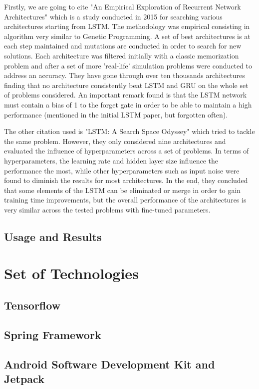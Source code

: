 Firstly, we are going to cite "An Empirical Exploration of Recurrent Network Architectures" \cite{jozefowicz2015empirical} which is a study conducted in 2015 for searching various architectures starting from LSTM. The methodology was empirical consisting in algorithm very similar to Genetic Programming. A set of best architectures is at each step maintained and mutations are conducted in order to search for new solutions. Each architecture was filtered initially with a classic memorization problem and after a set of more 'real-life' simulation problems were conducted to address an accuracy. They have gone through over ten thousands architectures finding that no architecture consistently beat LSTM and GRU on the whole set of problems considered. An important remark found is that the LSTM network must contain a bias of 1 to the forget gate in order to be able to maintain a high performance (mentioned in the initial LSTM paper, but forgotten often).

The other citation used is "LSTM: A Search Space Odyssey" \cite{greff2016lstm} which tried to tackle the same problem. However, they only considered nine architectures and evaluated the influence of hyperparameters across a set of problems. In terms of hyperparameters, the learning rate and hidden layer size influence the performance the most, while other hyperparameters such as input noise were found to diminish the results for most architectures. In the end, they concluded that some elements of the LSTM can be eliminated or merge in order to gain training time improvements, but the overall performance of the architectures is very similar across the tested problems with fine-tuned parameters.


\subsection{Usage and Results}


\newpage
\section{Set of Technologies}

\subsection{Tensorflow}

\subsection{Spring Framework}

\subsection{Android Software Development Kit and Jetpack}
